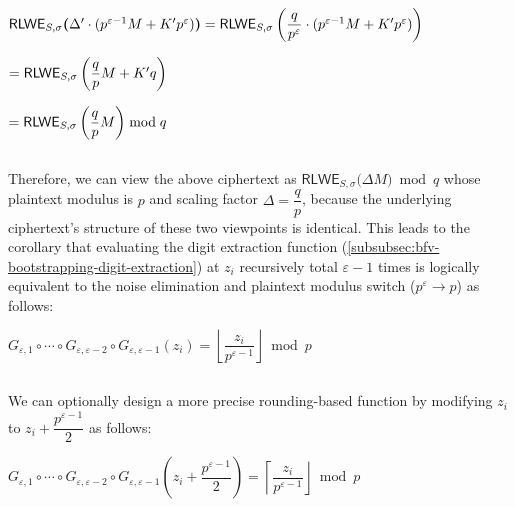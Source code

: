 $\textsf{RLWE}_{S, \sigma}\bm(\Delta' \cdot (p^{\varepsilon-1}M + K'p^\varepsilon) \bm) = \textsf{RLWE}_{S, \sigma}\bm\left(\dfrac{q}{p^\varepsilon} \cdot (p^{\varepsilon-1}M + K'p^\varepsilon) \bm\right)$

$ = \textsf{RLWE}_{S, \sigma}\bm\left(\dfrac{q}{p}M + K'q \bm\right)$

$ = \textsf{RLWE}_{S, \sigma}\bm\left(\dfrac{q}{p}M \bm\right) \bmod q$

$ $

Therefore, we can view the above ciphertext as $ \textsf{RLWE}_{S, \sigma}\bm(\Delta M\bm) \bmod q$ whose plaintext modulus is $p$ and scaling factor $\Delta = \dfrac{q}{p}$, because the underlying ciphertext's structure of these two viewpoints is identical. This leads to the corollary that evaluating the digit extraction function (\autoref{subsubsec:bfv-bootstrapping-digit-extraction}) at $z_i$ recursively total $\varepsilon-1$ times is logically equivalent to the noise elimination and plaintext modulus switch ($p^\varepsilon \rightarrow p$) as follows:

$G_{\varepsilon,1} \circ \cdots \circ G_{\varepsilon,\varepsilon-2} \circ G_{\varepsilon,\varepsilon-1}(z_i) = \left\lfloor \dfrac{z_i}{p^{\varepsilon-1}} \right\rfloor \bmod p$ 


$ $

We can optionally design a more precise rounding-based function by modifying $z_i$ to $z_i + \dfrac{p^{\varepsilon-1}}{2}$ as follows:


$G_{\varepsilon,1} \circ \cdots \circ G_{\varepsilon,\varepsilon-2} \circ G_{\varepsilon,\varepsilon-1}\left(z_i + \dfrac{p^{\varepsilon-1}}{2}\right) = \left\lceil \dfrac{z_i}{p^{\varepsilon-1}} \right\rfloor \bmod p$ 






